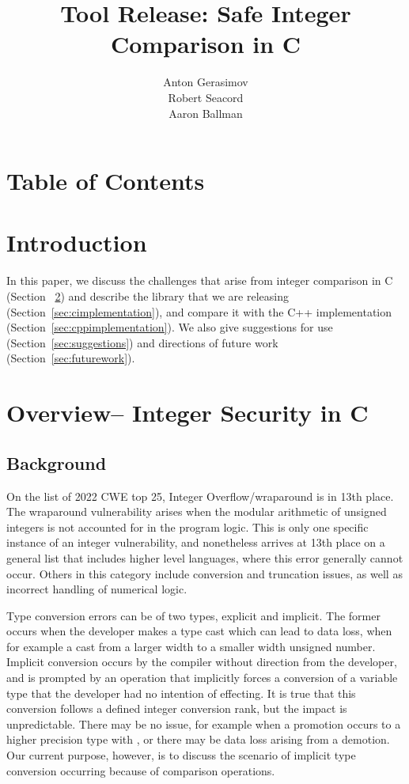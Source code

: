 \documentclass[11pt,letterpaper]{article}
\title{Tool Release: Safe Integer Comparison in C}
\author{Anton Gerasimov\\
Robert Seacord\\
Aaron Ballman}
\begin{document}
\maketitle
\newpage
\thispagestyle{fancy}
\clearpage
\section*{Table of Contents}
\makeatletter
\renewcommand\tableofcontents{\@starttoc{toc}} %
\makeatother
\bgroup%
\hypersetup%
\tableofcontents
\egroup%
\thispagestyle{nccsection}
\pagebreak


\section{Introduction}

In this paper, we discuss the challenges that arise from integer comparison in C (Section~
\ref{sec:overview}) and describe the library that we are releasing (Section~\ref{sec:cimplementation}), and compare it with the C++ implementation (Section~\ref{sec:cppimplementation}). 
We also give suggestions for use (Section~\ref{sec:suggestions}) and directions of future work (Section~\ref{sec:futurework}).



\section{Overview– Integer Security in C}
\label{sec:overview}

\subsection{Background }

On the list of 2022 CWE top 25, Integer Overflow/wraparound is in 13th place. 
The wraparound vulnerability arises when the modular arithmetic of unsigned integers is not accounted for in the program logic. 
This is only one specific instance of an integer vulnerability, and nonetheless arrives at 13th place on a general list that includes higher level languages, where this error generally cannot occur. 
Others in this category include conversion and truncation issues, as well as incorrect handling of numerical logic. 

Type conversion errors can be of two types, explicit and implicit. The former occurs when the developer makes a type cast which can lead to data loss, when for example a cast from a larger width to a smaller width unsigned number. Implicit conversion occurs by the compiler without direction from the developer, and is prompted by an operation that implicitly forces a conversion of a variable type that the developer had no intention of effecting. It is true that this conversion follows a defined integer conversion rank, but the impact is unpredictable. There may be no issue, for example when a promotion occurs to a higher precision type with , or there may be data loss arising from a demotion. Our current purpose, however, is to discuss the scenario of implicit type conversion occurring because of comparison operations.
\end{document}
